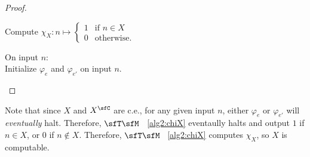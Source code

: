 \begin{problem}
\begin{answer}
\begin{proof}
        \begin{algorithm}[H]\label{alg2:chiX}
          \caption{Compute $\chi_X : n \mapsto \begin{cases}
            1 & \text{if } n \in X \\
            0 & \text{otherwise.}
          \end{cases}$}
          On input $n$: \\
          Initialize $\varphi_e$ and $\varphi_{e'}$ on input $n$. \\
        \end{algorithm}
      \end{proof}

    Note that since $X$ and $X^\sfC$ are c.e.,
    for any given input $n$, either $\varphi_e$ or $\varphi_{e'}$ will \emph{eventually} halt.
    Therefore, $\sfT \sfM$ ~\ref{alg2:chiX} eventaully halts and output $1$ if $n \in X$,
    or $0$ if $n \not \in X$.
    Therefore, $\sfT \sfM$ ~\ref{alg2:chiX} computes $\chi_X$,
    so $X$ is computable.
  \end{answer}
\end{problem}
